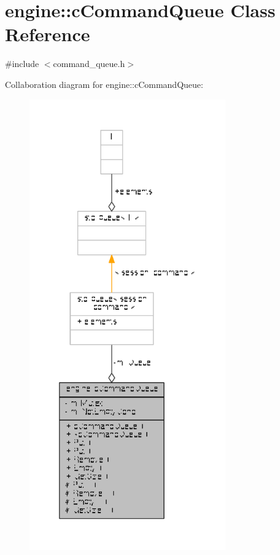 \hypertarget{classengine_1_1cCommandQueue}{\section{engine\-:\-:c\-Command\-Queue Class Reference}
\label{classengine_1_1cCommandQueue}
}


{\ttfamily \#include $<$command\-\_\-queue.\-h$>$}



Collaboration diagram for engine\-:\-:c\-Command\-Queue\-:
\nopagebreak
\begin{figure}[H]
\begin{center}
\leavevmode
\includegraphics[height=550pt]{classengine_1_1cCommandQueue__coll__graph}
\end{center}
\end{figure}
